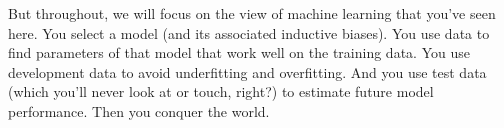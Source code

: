 But throughout, we will focus on the view of machine learning that
you've seen here.  You select a model (and its associated inductive
biases).  You use data to find parameters of that model that work well
on the training data.  You use development data to avoid underfitting
and overfitting.  And you use test data (which you'll never look at or
touch, right?) to estimate future model performance.  Then you conquer
the world.


\begin{comment}
Predicting the future
 - Not memorizing the past (simple prediction problem)
 - Generalizing from known to unknown
 - Training versus test data

Models, algorithms, theory and experiments

Evaluation

Optimizing 0/1 loss

Underfitting/overfitting by depth

Pruning

From two classes to M classes
\end{comment}

\begin{exercises}
\begin{Ex}
\TODO

\begin{solution}
\TODO
\end{solution}
\end{Ex}

\end{exercises}

